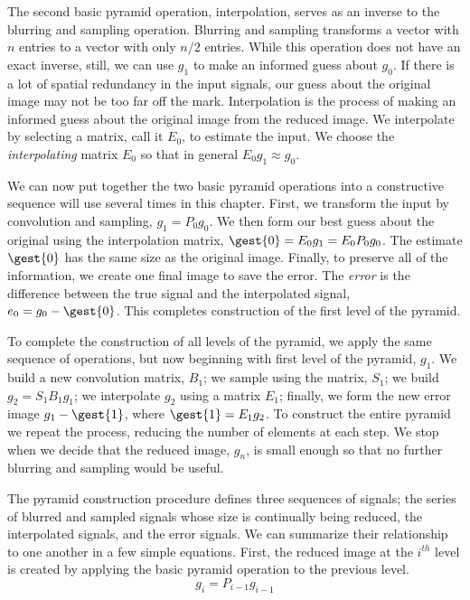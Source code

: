 The second basic pyramid operation, interpolation, serves as an
inverse to the blurring and sampling operation.  Blurring and sampling
transforms a vector with $n$ entries to a vector with only $n/2$
entries.  While this operation does not have an exact inverse, still,
we can use $g_1$ to make an informed guess about $g_0$.  If there is a
lot of spatial redundancy in the input signals, our guess about the original
image may not be too far off the mark.  Interpolation is the process
of making an informed guess about the original image from the reduced
image. We interpolate by selecting a matrix, call it $E_0$, to
estimate the input.  We choose the {\em interpolating} matrix $E_0$ so
that in general $E_0 g_1 \approx g_0$.

We can now put together the two basic pyramid operations into a
constructive sequence will use several times in this chapter.  First,
we transform the input by convolution and sampling, $g_1 = P_0 g_0$.
We then form our best guess about the original using the interpolation
matrix, $\gest{0} = E_0 g_{1} = E_0 P_0 g_{0}$.  The estimate $\gest{0}$
has the same size as the original image.  Finally, to preserve
all of the information, we create one final image to save the error.
The {\em error} is the difference between the true signal and the
interpolated signal, $e_{0} = g_0 - \gest{0}$.  This completes
construction of the first level of the pyramid.

To complete the construction of all levels of the pyramid, we apply
the same sequence of operations, but now beginning with first level of
the pyramid, $g_1$.  We build a new convolution matrix, $B_1$; we
sample using the matrix, $S_1$; we build $g_2 = S_1 B_1 g_1$; we
interpolate $g_2$ using a matrix $E_1 $; finally, we form the new
error image $g_1 - \gest{1}$, where $\gest{1} = E_1 g_2$.  To
construct the entire pyramid we repeat the process, reducing the
number of elements at each step.  We stop when we decide that the
reduced image, $g_n$, is small enough so that no further blurring and
sampling would be useful.

The pyramid construction procedure defines three sequences of signals;
the series of blurred and sampled signals whose size is continually
being reduced, the interpolated signals, and the error signals.  We
can summarize their relationship to one another in a few simple
equations.  First, the reduced image at the $i^{th}$ level is created
by applying the basic pyramid operation to the previous level.
\begin{equation}
\label{e7:reduced}
g_i = P_{i - 1} g_{i-1}
\end{equation}


